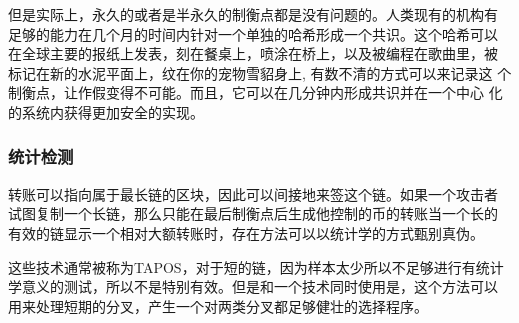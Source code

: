 \documentclass[letterpaper]{article}
\begin{document}
但是实际上，永久的或者是半永久的制衡点都是没有问题的。人类现有的机构有
足够的能力在几个月的时间内针对一个单独的哈希形成一个共识。这个哈希可以
在全球主要的报纸上发表，刻在餐桌上，喷涂在桥上，以及被编程在歌曲里，被
标记在新的水泥平面上，纹在你的宠物雪貂身上, 有数不清的方式可以来记录这
个制衡点，让作假变得不可能。而且，它可以在几分钟内形成共识并在一个中心
化的系统内获得更加安全的实现。

\subsubsection{统计检测}
转账可以指向属于最长链的区块，因此可以间接地来签这个链。如果一个攻击者
试图复制一个长链，那么只能在最后制衡点后生成他控制的币的转账当一个长的
有效的链显示一个相对大额转账时，存在方法可以以统计学的方式甄别真伪。

这些技术通常被称为TAPOS，对于短的链，因为样本太少所以不足够进行有统计
学意义的测试，所以不是特别有效。但是和一个技术同时使用是，这个方法可以
用来处理短期的分叉，产生一个对两类分叉都足够健壮的选择程序。
\end{document}

